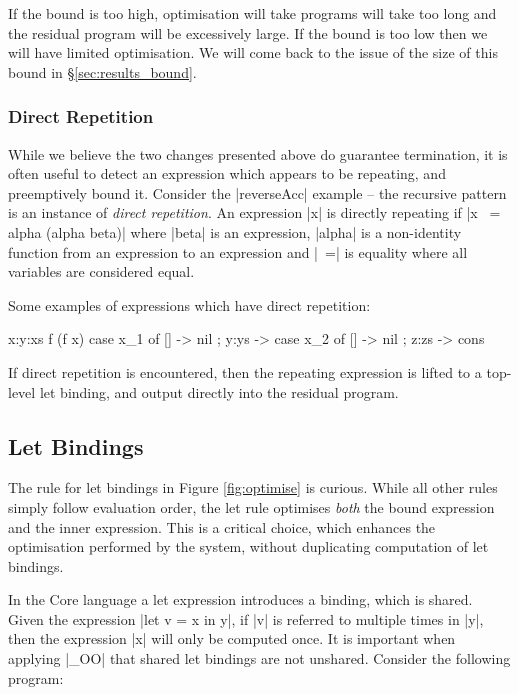 \documentclass{llncs}
\begin{document}
If the bound is too high, optimisation will take programs will take too long and the residual program will be excessively large. If the bound is too low then we will have limited optimisation. We will come back to the issue of the size of this bound in \S\ref{sec:results_bound}.

\subsubsection{Direct Repetition}
\label{sec:direct}

While we believe the two changes presented above do guarantee termination, it is often useful to detect an expression which appears to be repeating, and preemptively bound it. Consider the |reverseAcc| example -- the recursive pattern is an instance of \textit{direct repetition}. An expression |x| is directly repeating if |x ~= alpha (alpha beta)| where |beta| is an expression, |alpha| is a non-identity function from an expression to an expression and |~=| is equality where all variables are considered equal.

Some examples of expressions which have direct repetition:

\begin{code}
x:y:xs
f (f x)
case x_1 of {[] -> nil ; y:ys -> case x_2 of {[] -> nil ; z:zs -> cons}}
\end{code}

If direct repetition is encountered, then the repeating expression is lifted to a top-level let binding, and output directly into the residual program.

\subsection{Let Bindings}
\label{sec:let}

The rule for let bindings in Figure \ref{fig:optimise} is curious. While all other rules simply follow evaluation order, the let rule optimises \textit{both} the bound expression and the inner expression. This is a critical choice, which enhances the optimisation performed by the system, without duplicating computation of let bindings.

In the Core language a let expression introduces a binding, which is shared. Given the expression |let v = x in y|, if |v| is referred to multiple times in |y|, then the expression |x| will only be computed once. It is important when applying |_OO| that shared let bindings are not unshared. Consider the following program:
\end{document}
